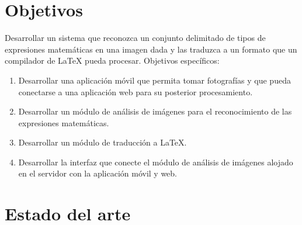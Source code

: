 
\section{Objetivos}
Desarrollar un sistema que reconozca un conjunto delimitado de tipos de expresiones matemáticas en una imagen dada y las traduzca a un formato que un compilador de LaTeX pueda procesar.
\bigskip
Objetivos específicos:
\begin{enumerate}
    \item Desarrollar una aplicación móvil que permita tomar fotografías y que pueda conectarse a una aplicación web para su posterior procesamiento.
    \item Desarrollar un módulo de análisis de imágenes para el reconocimiento de las expresiones matemáticas.
    \item Desarrollar un módulo de traducción a LaTeX.
    \item Desarrollar la interfaz que conecte el módulo de análisis de imágenes alojado en el servidor con la aplicación móvil y web.
\end{enumerate}


\section{Estado del arte}

